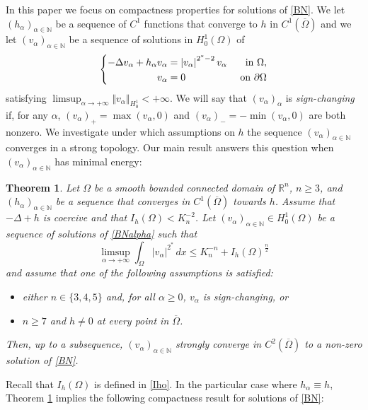\documentclass[10pt]{amsart}
\numberwithin{equation}{section}
\newcommand{\Om}{\Omega}
\def \rr {\mathbb{R}}
\def\la{\alpha}
\def \va{v_{\alpha}}
\def \ha{h_{\alpha}}
\def \nn{\mathbb{N}}
\theoremstyle{plain}
\newtheorem{theo}{Theorem}[section]%
\theoremstyle{remark}
\begin{document}
In this paper we focus on compactness properties for solutions of \eqref{BN}. We let $(h_\alpha)_{\alpha \in \mathbb{N}}$ be a sequence of $C^1$ functions that converge to $h$ in $
C^1(\overline{\Om})$ and we let $(v_\alpha)_{\alpha \in \mathbb{N}}$ be a sequence of solutions in $H^1_0(\Om)$ of 
		\begin{equation}\label{BNalpha}
	\left\{\begin{aligned}
			-\Delta v_\alpha+h_\alpha v_\alpha& =\left|v_\alpha\right|^{2^*-2}v_\alpha&\hbox{ in } \Omega, \\
			v_\alpha& = 0  &\hbox{ on } \partial \Omega
		\end{aligned}\right.
	\end{equation}
	satisfying $\limsup_{\alpha \to + \infty} \Vert v_\alpha \Vert_{H^1_0} < + \infty$. We will say that $(v_\alpha)_\alpha$ is \emph{sign-changing} if, for any $\alpha$, $(v_\alpha)_+ = \max(v_\alpha,0)$ and $(v_\alpha)_- = - \min(v_\alpha,0)$ are both nonzero. We investigate under which assumptions on $h$ the sequence $(v_\alpha)_{\alpha \in \mathbb{N}}$ converges in a strong topology. Our main result answers this question when $(\va)_{\la \in \nn}$ has minimal energy: 
	\begin{theo}\label{maintheo2bis}
	Let $\Om$ be a smooth bounded connected domain of $\rr^n$, $n\geq 3$, and $(\ha)_{\alpha\in\nn}$ be a sequence that converges in $C^{1}(\overline{\Om})$ towards $h$. Assume that $-\Delta+h$ is coercive and that $I_{h}(\Om)<K_{n}^{-2}$. Let   $(\va)_{\alpha\in \nn}\in H_0^1(\Om)$ be a sequence of solutions of \eqref{BNalpha} such that
\begin{equation}\label{cond:energy1}
\limsup_{\alpha\to +\infty}\int_{\Om} |\va|^{2^*}\, dx\leq K_{n}^{-n}+I_{h}(\Om)^{\frac{n}{2}}
\end{equation}
and assume that one of the following assumptions is satisfied: 
		\begin{itemize}
		\item  either $n \in \{3,4,5\}$ and, for all $\alpha \ge 0$, $\va$ is sign-changing, or
		\item  $n \ge 7$ and $h \neq 0$ at every point in $\overline{\Om}$.
	\end{itemize}
Then, up to a subsequence, $(\va)_{\alpha\in \nn}$ strongly converge in $C^2(\overline{\Om})$ to a non-zero solution of \eqref{BN}.
\end{theo} 
Recall that $I_{h}(\Om)$ is defined in \eqref{Iho}. In the particular case where $h_\alpha \equiv h$, Theorem \ref{maintheo2bis} implies the following compactness result for solutions of \eqref{BN}: 
\end{document}
